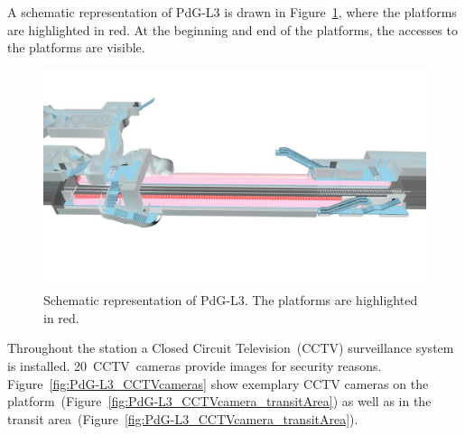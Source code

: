 A schematic representation of PdG-L3 is drawn in Figure~\ref{fig:PdG-L3_schematic}, where the platforms are highlighted in red. At the beginning and end of the platforms, the accesses to the platforms are visible.

\begin{figure}[htbp]
  \centering
  \includegraphics[width=\linewidth]{Figures/PdG-L3_schematic2.jpg} 
  \caption{Schematic representation of PdG-L3. The platforms are highlighted in red. \cite{TMB_2014}}
  \label{fig:PdG-L3_schematic}
\end{figure}

Throughout the station a Closed Circuit Television~(CCTV) surveillance system is installed. 20~CCTV~cameras provide images for security reasons. Figure~\ref{fig:PdG-L3_CCTVcameras} show exemplary CCTV cameras on the platform~(Figure~\ref{fig:PdG-L3_CCTVcamera_transitArea}) as well as in the transit area~(Figure~\ref{fig:PdG-L3_CCTVcamera_transitArea}).

